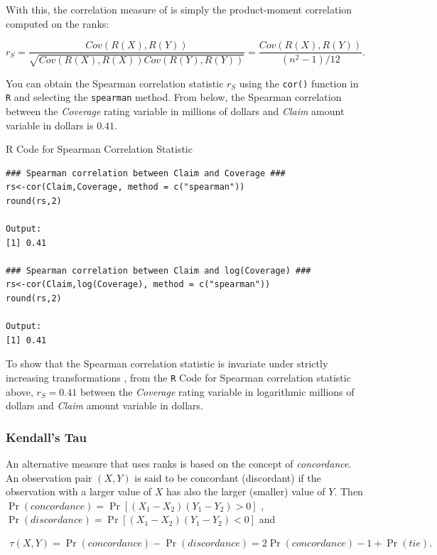 \documentclass[]{book}
\theoremstyle{definition}
\theoremstyle{definition}
\theoremstyle{definition}
\theoremstyle{remark}
\begin{document}
With this, the correlation measure of \citep{spearman1904proof} is
simply the product-moment correlation computed on the ranks:

\begin{equation*}
r_S = \frac{Cov(R(X),R(Y))}{\sqrt{Cov(R(X),R(X))Cov(R(Y),R(Y))}}
= \frac{Cov(R(X),R(Y))}{(n^2-1)/12} .
\end{equation*}

You can obtain the Spearman correlation statistic \(r_S\) using the
\texttt{cor()} function in \texttt{R} and selecting the
\texttt{spearman} method. From below, the Spearman correlation between
the \emph{Coverage} rating variable in millions of dollars and
\emph{Claim} amount variable in dollars is \(0.41\).

R Code for Spearman Correlation Statistic

\hypertarget{display.spearman.2}{}
\begin{verbatim}
### Spearman correlation between Claim and Coverage ###
rs<-cor(Claim,Coverage, method = c("spearman"))
round(rs,2)

Output:
[1] 0.41

### Spearman correlation between Claim and log(Coverage) ###
rs<-cor(Claim,log(Coverage), method = c("spearman"))
round(rs,2)

Output:
[1] 0.41
\end{verbatim}

To show that the Spearman correlation statistic is invariate under
strictly increasing transformations , from the \texttt{R} Code for
Spearman correlation statistic above, \(r_S=0.41\) between the
\emph{Coverage} rating variable in logarithmic millions of dollars and
\emph{Claim} amount variable in dollars.

\subsubsection{Kendall's Tau}\label{kendalls-tau}

An alternative measure that uses ranks is based on the concept of
\emph{concordance}. An observation pair \((X,Y)\) is said to be
concordant (discordant) if the observation with a larger value of \(X\)
has also the larger (smaller) value of \(Y\). Then
\(\Pr(concordance) = \Pr[ (X_1-X_2)(Y_1-Y_2) >0 ]\) ,
\(\Pr(discordance) = \Pr[ (X_1-X_2)(Y_1-Y_2) <0 ]\) and

\begin{eqnarray*}
\tau(X,Y)= \Pr(concordance) - \Pr(discordance) = 2\Pr(concordance) - 1 + \Pr(tie).
\end{eqnarray*}
\end{document}

